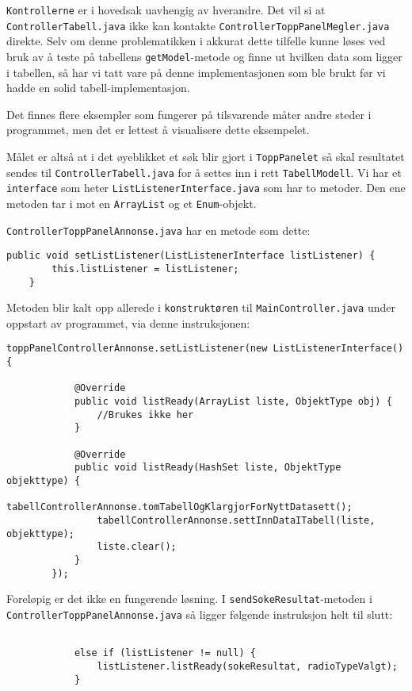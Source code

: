 \texttt{Kontrollerne} er i hovedsak uavhengig av hverandre. Det vil si at \texttt{ControllerTabell.java} ikke kan kontakte \texttt{ControllerToppPanelMegler.java} direkte. Selv om denne problematikken i akkurat dette tilfelle kunne løses ved bruk av å teste på tabellens \texttt{getModel}-metode og finne ut hvilken data som ligger i tabellen, så har vi tatt vare på denne implementasjonen som ble brukt før vi hadde en solid tabell-implementasjon.

Det finnes flere eksempler som fungerer på tilsvarende måter andre steder i programmet, men det er lettest å visualisere dette eksempelet.

Målet er altså at i det øyeblikket et søk blir gjort i \texttt{ToppPanelet} så skal resultatet sendes til \texttt{ControllerTabell.java} for å settes inn i rett \texttt{TabellModell}.
Vi har et \texttt{interface} som heter \texttt{ListListenerInterface.java} som har to metoder. Den ene metoden tar i mot en \texttt{ArrayList} og et \texttt{Enum}-objekt.

\texttt{ControllerToppPanelAnnonse.java} har en metode som dette:

\begin{lstlisting}[caption=Kodesnutt nummer 1: \texttt{setListListener}-metoden fra \texttt{ControllerToppPanelAnnonse.java}]
    public void setListListener(ListListenerInterface listListener) {
        this.listListener = listListener;
    }
\end{lstlisting}

Metoden blir kalt opp allerede i \texttt{konstruktøren} til \texttt{MainController.java} under oppstart av programmet, via denne instruksjonen:

\begin{lstlisting}[caption=Kodesnutt nummer 2: Setter lytter fra \texttt{MainController.java}]
        toppPanelControllerAnnonse.setListListener(new ListListenerInterface() {

            @Override
            public void listReady(ArrayList liste, ObjektType obj) {
                //Brukes ikke her
            }

            @Override
            public void listReady(HashSet liste, ObjektType objekttype) {
                tabellControllerAnnonse.tomTabellOgKlargjorForNyttDatasett();
                tabellControllerAnnonse.settInnDataITabell(liste, objekttype);
                liste.clear();
            }
        });
\end{lstlisting}

Foreløpig er det ikke en fungerende løsning. I \texttt{sendSokeResultat}-metoden i \texttt{ControllerToppPanelAnnonse.java} så ligger følgende instruksjon helt til slutt:
\begin{lstlisting}[caption=Kodesnutt nummer 3: Utdrag fra \texttt{sendSokeResultat}-metoden i \texttt{ControllerToppPanelAnnonse.java}]

            else if (listListener != null) {
                listListener.listReady(sokeResultat, radioTypeValgt);
            }
\end{lstlisting}

